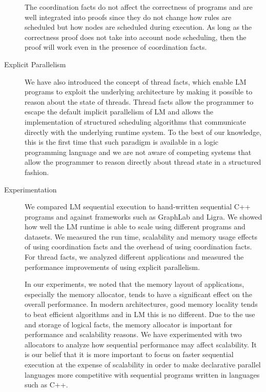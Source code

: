 \begin{description}
The coordination facts do not affect the correctness of programs and are well
integrated into proofs since they do not change how rules are scheduled but how
nodes are scheduled during execution. As long as the correctness proof does not
take into account node scheduling, then the proof will work even in the presence
of coordination facts.

\item[Explicit Parallelism]

We have also introduced the concept of thread facts, which enable LM programs to
exploit the underlying architecture by making it possible to reason about the
state of threads. Thread facts allow the programmer to escape the default
implicit parallelism of LM and allows the implementation of structured
scheduling algorithms that communicate directly with the underlying runtime
system. To the best of our knowledge, this is the first time that such paradigm
is available in a logic programming language and we are not aware of competing
systems that allow the programmer to reason directly about thread state in a
structured fashion.

\item[Experimentation]

We compared LM sequential execution to hand-written sequential C++ programs and
against frameworks such as GraphLab and Ligra. We showed how well the LM runtime
is able to scale using different programs and datasets. We measured the run
time, scalability and memory usage effects of using coordination facts and the
overhead of using coordination facts. For thread facts, we analyzed different
applications and measured the performance improvements of using explicit
parallelism.

In our experiments, we noted that the memory layout of applications, especially
the memory allocator, tends to have a significant effect on the overall
performance. In modern architectures, good memory locality tends to beat
efficient algorithms and in LM this is no different. Due to the use and storage
of logical facts, the memory allocator is important for performance and
scalability reasons. We have experimented with two allocators to analyze how
sequential performance may affect scalability. It is our belief that it is more
important to focus on faster sequential execution at the expense of scalability
in order to make declarative parallel languages more competitive with sequential
programs written in languages such as C++.

\end{description}

